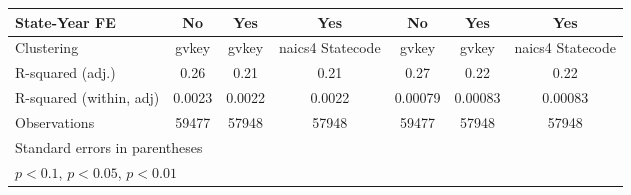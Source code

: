 {\begin{tabular}{l*{6}{c}}
\addlinespace
State-Year FE       &          No         &         Yes         &         Yes         &          No         &         Yes         &         Yes         \\
\midrule
Clustering          &       gvkey         &       gvkey         &naics4 Statecode         &       gvkey         &       gvkey         &naics4 Statecode         \\
R-squared (adj.)    &        0.26         &        0.21         &        0.21         &        0.27         &        0.22         &        0.22         \\
R-squared (within, adj)&      0.0023         &      0.0022         &      0.0022         &     0.00079         &     0.00083         &     0.00083         \\
Observations        &       59477         &       57948         &       57948         &       59477         &       57948         &       57948         \\
\bottomrule
\multicolumn{7}{l}{\footnotesize Standard errors in parentheses}\\
\multicolumn{7}{l}{\footnotesize \sym{*} \(p<0.1\), \sym{**} \(p<0.05\), \sym{***} \(p<0.01\)}\\
\end{tabular}
}
